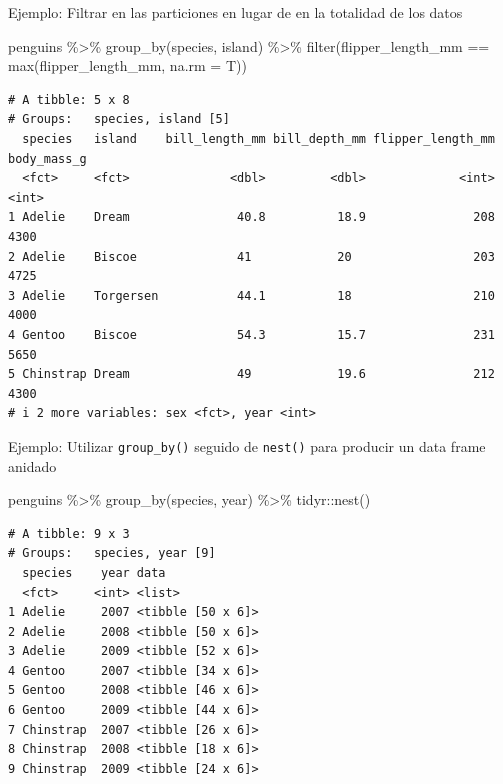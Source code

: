 \documentclass[
  letterpaper,
  DIV=11,
  numbers=noendperiod]{scrreprt}
\newenvironment{Shaded}{\begin{snugshade}}{\end{snugshade}}
\newcommand{\AttributeTok}[1]{\textcolor[rgb]{0.40,0.45,0.13}{#1}}
\newcommand{\FunctionTok}[1]{\textcolor[rgb]{0.28,0.35,0.67}{#1}}
\newcommand{\NormalTok}[1]{\textcolor[rgb]{0.00,0.23,0.31}{#1}}
\newcommand{\SpecialCharTok}[1]{\textcolor[rgb]{0.37,0.37,0.37}{#1}}
\begin{document}
{Ejemplo}: Filtrar en las particiones en lugar de en la totalidad de los
datos

\begin{Shaded}
\begin{Highlighting}[]
\NormalTok{penguins }\SpecialCharTok{\%\textgreater{}\%} 
  \FunctionTok{group\_by}\NormalTok{(species, island) }\SpecialCharTok{\%\textgreater{}\%} 
  \FunctionTok{filter}\NormalTok{(flipper\_length\_mm }\SpecialCharTok{==} \FunctionTok{max}\NormalTok{(flipper\_length\_mm, }\AttributeTok{na.rm =}\NormalTok{ T))}
\end{Highlighting}
\end{Shaded}

\begin{verbatim}
# A tibble: 5 x 8
# Groups:   species, island [5]
  species   island    bill_length_mm bill_depth_mm flipper_length_mm body_mass_g
  <fct>     <fct>              <dbl>         <dbl>             <int>       <int>
1 Adelie    Dream               40.8          18.9               208        4300
2 Adelie    Biscoe              41            20                 203        4725
3 Adelie    Torgersen           44.1          18                 210        4000
4 Gentoo    Biscoe              54.3          15.7               231        5650
5 Chinstrap Dream               49            19.6               212        4300
# i 2 more variables: sex <fct>, year <int>
\end{verbatim}

{Ejemplo}: Utilizar \texttt{group\_by()} seguido de \texttt{nest()} para
producir un data frame anidado

\begin{Shaded}
\begin{Highlighting}[]
\NormalTok{penguins }\SpecialCharTok{\%\textgreater{}\%} 
  \FunctionTok{group\_by}\NormalTok{(species, year) }\SpecialCharTok{\%\textgreater{}\%} 
\NormalTok{  tidyr}\SpecialCharTok{::}\FunctionTok{nest}\NormalTok{()}
\end{Highlighting}
\end{Shaded}

\begin{verbatim}
# A tibble: 9 x 3
# Groups:   species, year [9]
  species    year data             
  <fct>     <int> <list>           
1 Adelie     2007 <tibble [50 x 6]>
2 Adelie     2008 <tibble [50 x 6]>
3 Adelie     2009 <tibble [52 x 6]>
4 Gentoo     2007 <tibble [34 x 6]>
5 Gentoo     2008 <tibble [46 x 6]>
6 Gentoo     2009 <tibble [44 x 6]>
7 Chinstrap  2007 <tibble [26 x 6]>
8 Chinstrap  2008 <tibble [18 x 6]>
9 Chinstrap  2009 <tibble [24 x 6]>
\end{verbatim}
\end{document}
